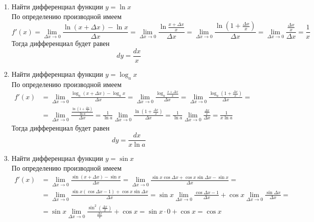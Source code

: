 \documentclass[12pt]{article}
\begin{document}
\begin{enumerate}
\[\begin{aligned}
				  &= a^x \lim_{\Delta x \to 0}\frac{e^{\Delta x \ln{a}} - 1}{\Delta x} = a^x \lim_{\Delta x \to 0}\frac{\Delta x \ln{a}}{\Delta x} = a^x \ln{a}
		\end{aligned}
	\]
	Тогда дифференциал будет равен
	\[
		dy = a^x \ln{a} \, dx
	\]
\item {\hywenhei Найти дифференциал функции $y = \ln{x}$} \\
	По определению производной имеем
	\[
		f'(x) = \lim_{\Delta x \to 0}\frac{\ln{(x + \Delta x)} - \ln{x}}{\Delta x} = \lim_{\Delta x \to 0}\frac{\ln{\frac{x + \Delta x}{x}}}{\Delta x} = \lim_{\Delta x \to 0}\frac{\ln{(1 + \frac{\Delta x}{x})}}{\Delta x}= \lim_{\Delta x \to 0}\frac{\frac{\Delta x}{x}}{\Delta x} = \frac{1}{x}
	\]
	Тогда дифференциал будет равен
	\[
		dy = \dfrac{dx}{x}
	\]
\item {\hywenhei Найти дифференциал функции $y = \log_a{x}$} \\
	По определению производной имеем
	\[
		\begin{aligned}
			f'(x) &= \lim_{\Delta x \to 0}\frac{\log_a{(x + \Delta x)} - \log_a{x}}{\Delta x} = \lim_{\Delta x \to 0}\frac{\log_a{\frac{x + \Delta x}{x}}}{\Delta x} = \lim_{\Delta x \to 0}\frac{\log_a{(1 + \frac{\Delta x}{x})}}{\Delta x}= \\
				  &= \lim_{\Delta x \to 0}\frac{\frac{\ln{(1 + \frac{\Delta x}{x})}}{\ln{a}}}{\Delta x} = \frac{1}{\ln{a}} \lim_{\Delta x \to 0}\frac{\ln{(1 + \frac{\Delta x}{x})}}{\Delta x} = \frac{1}{\ln{a}} \lim_{\Delta x \to 0}\frac{\frac{\Delta x}{x}}{\Delta x} = \frac{1}{x \ln{a}}
		\end{aligned}
	\]
	Тогда дифференциал будет равен
	\[
		dy = \dfrac{dx}{x \ln{a}}
	\]
\item {\hywenhei Найти дифференциал функции $y = \sin{x}$} \\
	По определению производной имеем
	\[
	\begin{aligned}
		f'(x) &= \lim_{\Delta x \to 0}\frac{\sin{(x + \Delta x)} - \sin{x}}{\Delta x} = \lim_{\Delta x \to 0}\frac{\sin{x}\cos{\Delta x} + \cos{x}\sin{\Delta x} - \sin{x}}{\Delta x} = \\
			  &= \lim_{\Delta x \to 0}\frac{\sin{x}(\cos{\Delta x} - 1) + \cos{x}\sin{\Delta x}}{\Delta x} = \sin{x} \lim_{\Delta x \to 0}\frac{\cos{\Delta x} - 1}{\Delta x} + \cos{x} \lim_{\Delta x \to 0}\frac{\sin{\Delta x}}{\Delta x} = \\
			  &= \sin{x} \lim_{\Delta x \to 0}\frac{\sin^2(\frac{\Delta x}{2})}{\frac{\Delta x}{2}} + \cos{x} = \sin{x} \cdot 0 + \cos{x} = \cos{x}
	\end{aligned}
\]
\end{enumerate}
\end{document}
